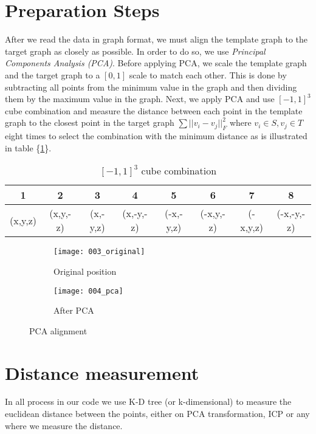 \documentclass[../structure.tex]{subfiles}
\begin{document}
\section{Preparation Steps}
After we read the data in graph format, we must align the template graph to the target graph as closely as possible. In order to do so, we use \textit{Principal Components Analysis (PCA)}. Before applying PCA, we scale the template graph and the target graph to a $[0,1]$ scale to match each other. This is done by subtracting all points from the minimum value in the graph and then dividing them by the maximum value in the graph. Next, we apply PCA and use $[-1,1]^3$ cube combination and measure the distance between each point in the template graph to the closest point in the target graph $\sum ||v_i-v_j||_F^2$ where $v_i \in S, v_j \in T$ eight times to select the combination with the minimum distance as is illustrated in table \{\ref{table:cube}\}.
\begin{center}
\begin{table}[h]
	\begin{tabular}{| c | c | c | c | c | c | c | c |}
	\hline
	1 & 2 & 3 & 4 & 5 & 6 & 7 & 8\\
	\hline
	(x,y,z) & (x,y,-z) & (x,-y,z) & (x,-y,-z) & (-x,-y,z) & (-x,y,-z) & (-x,y,z) & (-x,-y,-z)\\
	\hline
	\end{tabular}
\caption{$[-1,1]^3$ cube combination}
\label{table:cube}
\end{table}
\end{center}

\begin{figure}[h!]
	\centering
	\begin{subfigure}[b]{0.59\textwidth}
	\texttt{[image: 003\_original]}
	\caption{Original position}
	\end{subfigure}
	\begin{subfigure}[b]{0.39\textwidth}
	\texttt{[image: 004\_pca]}
	\caption{After PCA}
	\end{subfigure}
\label{fig:pca}
\caption{PCA alignment}
\end{figure}


\section{Distance measurement}
In all process in our code we use K-D tree (or k-dimensional)  to measure the euclidean distance between the points, either on PCA transformation, ICP or any where we measure the distance.
\end{document}

